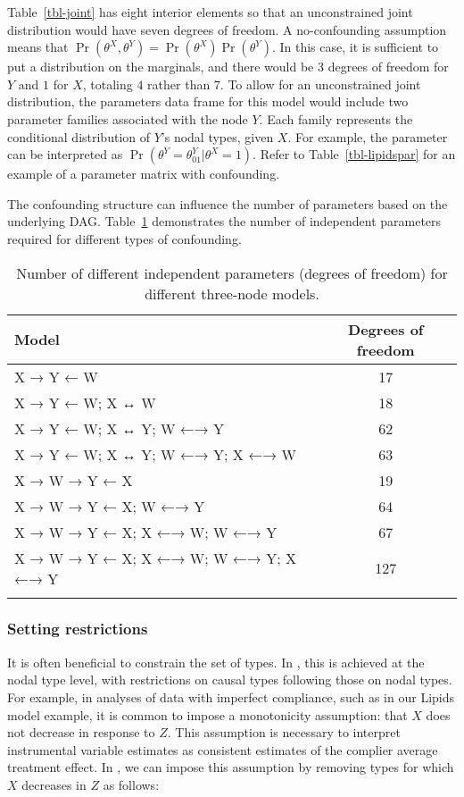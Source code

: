 \documentclass[
  11pt,
  article]{jss}
\renewcommand{\texttt}[1]{\code{#1}}
\begin{document}
Table~\ref{tbl-joint} has eight interior elements so that an
unconstrained joint distribution would have seven degrees of freedom. A
no-confounding assumption means that
\(\Pr(\theta^X, \theta^Y) = \Pr(\theta^X)\Pr(\theta^Y)\). In this case,
it is sufficient to put a distribution on the marginals, and there would
be \(3\) degrees of freedom for \(Y\) and \(1\) for \(X\), totaling
\(4\) rather than \(7\). To allow for an unconstrained joint
distribution, the parameters data frame for this model would include two
parameter families associated with the node \(Y\). Each family
represents the conditional distribution of \(Y\)'s nodal types, given
\(X\). For example, the parameter \texttt{Y01\_X.1} can be interpreted
as \(\Pr(\theta^Y = \theta^Y_{01} | \theta^X=1)\). Refer to
Table~\ref{tbl-lipidspar} for an example of a parameter matrix with
confounding.

The confounding structure can influence the number of parameters based
on the underlying DAG. Table~\ref{tbl-dof} demonstrates the number of
independent parameters required for different types of confounding.

\begin{longtable}{lc}

\toprule
Model & Degrees of freedom\\
\midrule
X → Y ← W & 17\\
X → Y ← W; X ↔ W & 18\\
X → Y ← W; X ↔ Y; W ←→ Y & 62\\
X → Y ← W; X ↔ Y; W ←→ Y; X ←→ W & 63\\
X → W → Y ← X & 19\\
X → W → Y ← X; W ←→ Y & 64\\
X → W → Y ← X; X ←→ W; W ←→ Y & 67\\
X → W → Y ← X; X ←→ W; W ←→ Y; X ←→ Y & 127\\
\bottomrule


\caption{\label{tbl-dof}Number of different independent parameters
(degrees of freedom) for different three-node models.}

\tabularnewline
\end{longtable}

\subsubsection{Setting restrictions}\label{restrictions}

It is often beneficial to constrain the set of types. In
, this is achieved at the nodal type level, with
restrictions on causal types following those on nodal types. For
example, in analyses of data with imperfect compliance, such as in our
Lipids model example, it is common to impose a monotonicity assumption:
that \(X\) does not decrease in response to \(Z\). This assumption is
necessary to interpret instrumental variable estimates as consistent
estimates of the complier average treatment effect. In
, we can impose this assumption by removing types for
which \(X\) decreases in \(Z\) as follows:
\end{document}
